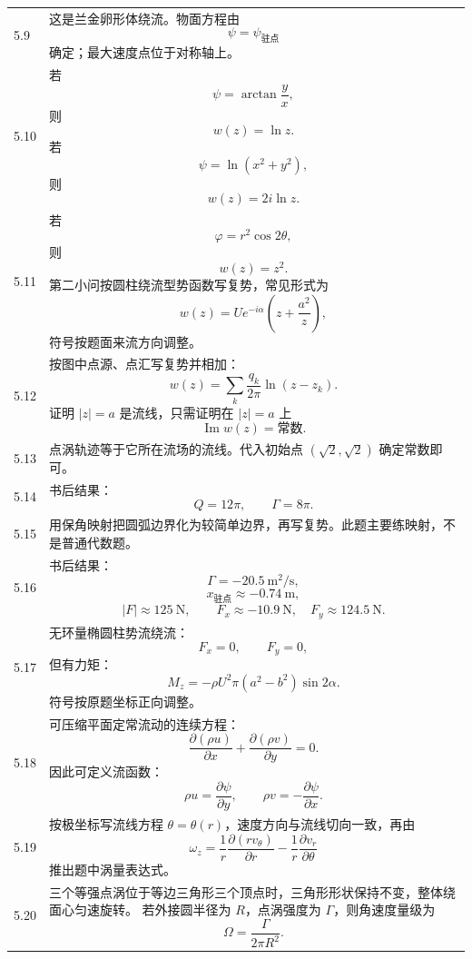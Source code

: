 \documentclass[UTF8,zihao=-4]{ctexart}
\begin{document}
\begin{longtable}{p{1.3cm}p{12.6cm}}
5.9 &
这是兰金卵形体绕流。物面方程由
\[
\psi=\psi_{\text{驻点}}
\]
确定；最大速度点位于对称轴上。\\

5.10 &
若
\[
\psi=\arctan\frac{y}{x},
\]
则
\[
w(z)=\ln z.
\]
若
\[
\psi=\ln(x^2+y^2),
\]
则
\[
w(z)=2i\ln z.
\]\\

5.11 &
若
\[
\varphi=r^2\cos2\theta,
\]
则
\[
w(z)=z^2.
\]
第二小问按圆柱绕流型势函数写复势，常见形式为
\[
w(z)=Ue^{-i\alpha}\left(z+\frac{a^2}{z}\right),
\]
符号按题面来流方向调整。\\

5.12 &
按图中点源、点汇写复势并相加：
\[
w(z)=\sum_k \frac{q_k}{2\pi}\ln(z-z_k).
\]
证明 $|z|=a$ 是流线，只需证明在 $|z|=a$ 上
\[
\operatorname{Im}w(z)=\text{常数}.
\]\\

5.13 &
点涡轨迹等于它所在流场的流线。代入初始点 $(\sqrt2,\sqrt2)$ 确定常数即可。\\

5.14 &
书后结果：
\[
Q=12\pi,\qquad \Gamma=8\pi.
\]\\

5.15 &
用保角映射把圆弧边界化为较简单边界，再写复势。此题主要练映射，不是普通代数题。\\

5.16 &
书后结果：
\[
\Gamma=-20.5\ \mathrm{m^2/s},
\]
\[
x_{\text{驻点}}\approx -0.74\ \mathrm{m},
\]
\[
|F|\approx125\ \mathrm{N},
\qquad F_x\approx -10.9\ \mathrm{N},\quad F_y\approx124.5\ \mathrm{N}.
\]\\

5.17 &
无环量椭圆柱势流绕流：
\[
F_x=0,\qquad F_y=0,
\]
但有力矩：
\[
M_z=-\rho U^2\pi(a^2-b^2)\sin2\alpha.
\]
符号按原题坐标正向调整。\\

5.18 &
可压缩平面定常流动的连续方程：
\[
\frac{\partial(\rho u)}{\partial x}
+\frac{\partial(\rho v)}{\partial y}=0.
\]
因此可定义流函数：
\[
\rho u=\frac{\partial\psi}{\partial y},\qquad
\rho v=-\frac{\partial\psi}{\partial x}.
\]\\

5.19 &
按极坐标写流线方程 $\theta=\theta(r)$，速度方向与流线切向一致，再由
\[
\omega_z=\frac1r\frac{\partial(rv_\theta)}{\partial r}
-\frac1r\frac{\partial v_r}{\partial\theta}
\]
推出题中涡量表达式。\\

5.20 &
三个等强点涡位于等边三角形三个顶点时，三角形形状保持不变，整体绕面心匀速旋转。
若外接圆半径为 $R$，点涡强度为 $\Gamma$，则角速度量级为
\[
\Omega=\frac{\Gamma}{2\pi R^2}.
\]\\


\end{longtable}
\end{document}
